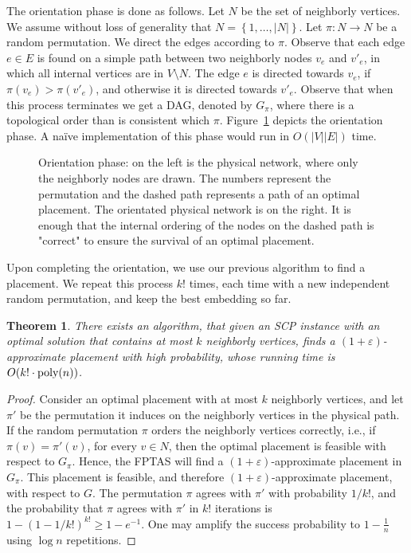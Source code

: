 \documentclass[11pt]{article}
\newtheorem{theorem}{Theorem}
\newcommand{\set}[1]{\left\{ #1 \right\}}
\newcommand{\inv}[1]{\frac{1}{#1}}
\newcommand{\abs}[1]{\left| #1 \right|}
\newcommand{\eps}{\varepsilon}
\newcommand{\scp}{\textsc{SCP}\xspace}
\begin{document}
The orientation phase is done as follows.  Let $N$ be the set of
neighborly vertices.  We assume without loss of generality that $N =
\set{1,\ldots,\abs{N}}$.
%
Let $\pi:N \to N$ be a random permutation.  We direct the edges
according to $\pi$.  Observe that each edge $e \in E$ is found on a
simple path between two neighborly nodes $v_e$ and $v'_e$, in which
all internal vertices are in $V \setminus N$.  The edge $e$ is
directed towards $v_e$, if $\pi(v_e) > \pi(v'_e)$, and otherwise it is
directed towards $v'_e$.
%
Observe that when this process terminates we get a DAG, denoted by
$G_\pi$, where there is a topological order than is consistent which
$\pi$.  Figure~\ref{fig:orientation} depicts the orientation phase.
%
A na\"ive implementation of this phase would run in $O(|V||E|)$ time.

\begin{figure}[t]
\centering
\scalebox{0.9}{
  
}
\caption{Orientation phase: on the left is the physical network, where
  only the neighborly nodes are drawn.  The numbers represent the
  permutation and the dashed path represents a path of an optimal
  placement.  The orientated physical network is on the right.  It is
  enough that the internal ordering of the nodes on the dashed path is
  "correct" to ensure the survival of an optimal placement. }
\label{fig:orientation}
\end{figure}

Upon completing the orientation, we use our previous algorithm to find
a placement.  We repeat this process $k!$ times, each time with a new
independent random permutation, and keep the best embedding so far.

\begin{theorem}
There exists an algorithm, that given an \scp instance with an optimal
solution that contains at most $k$ neighborly vertices, finds a
$(1+\eps)$-approximate placement with high probability, whose
running time is $O(k! \cdot \text{\rm poly}(n))$.
\end{theorem}
\begin{proof}
Consider an optimal placement with at most $k$ neighborly vertices,
and let $\pi'$ be the permutation it induces on the neighborly
vertices in the physical path.
%
If the random permutation $\pi$ orders the neighborly vertices
correctly, i.e., if $\pi(v) = \pi'(v)$, for every $v \in N$, then the
optimal placement is feasible with respect to $G_\pi$.  Hence, the
FPTAS will find a $(1+\eps)$-approximate placement in $G_\pi$.  This
placement is feasible, and therefore $(1+\eps)$-approximate placement,
with respect to $G$.
%
The permutation $\pi$ agrees with $\pi'$ with probability $1/k!$, and
the probability that $\pi$ agrees with $\pi'$ in $k!$ iterations is $1
- (1 - 1/k!)^{k!} \geq 1 - e^{-1}$.  One may amplify the success
probability to $1 - \inv{n}$ using $\log n$ repetitions.
\end{proof}
\end{document}
